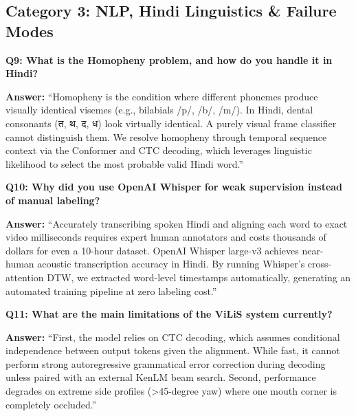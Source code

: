 \documentclass[11pt,a4paper]{article}
\begin{document}
\subsection{Category 3: NLP, Hindi Linguistics \& Failure Modes}

\textbf{Q9: What is the Homopheny problem, and how do you handle it in Hindi?}
\begin{tcolorbox}[colback=gray!5!white,colframe=gray!75!black]
\textbf{Answer:} ``Homopheny is the condition where different phonemes produce visually identical visemes (e.g., bilabials /p/, /b/, /m/). In Hindi, dental consonants (त, थ, द, ध) look virtually identical. A purely visual frame classifier cannot distinguish them. We resolve homopheny through temporal sequence context via the Conformer and CTC decoding, which leverages linguistic likelihood to select the most probable valid Hindi word.''
\end{tcolorbox}

\textbf{Q10: Why did you use OpenAI Whisper for weak supervision instead of manual labeling?}
\begin{tcolorbox}[colback=gray!5!white,colframe=gray!75!black]
\textbf{Answer:} ``Accurately transcribing spoken Hindi and aligning each word to exact video milliseconds requires expert human annotators and costs thousands of dollars for even a 10-hour dataset. OpenAI Whisper large-v3 achieves near-human acoustic transcription accuracy in Hindi. By running Whisper's cross-attention DTW, we extracted word-level timestamps automatically, generating an automated training pipeline at zero labeling cost.''
\end{tcolorbox}

\textbf{Q11: What are the main limitations of the ViLiS system currently?}
\begin{tcolorbox}[colback=gray!5!white,colframe=gray!75!black]
\textbf{Answer:} ``First, the model relies on CTC decoding, which assumes conditional independence between output tokens given the alignment. While fast, it cannot perform strong autoregressive grammatical error correction during decoding unless paired with an external KenLM beam search. Second, performance degrades on extreme side profiles (>45-degree yaw) where one mouth corner is completely occluded.''
\end{tcolorbox}
\end{document}
